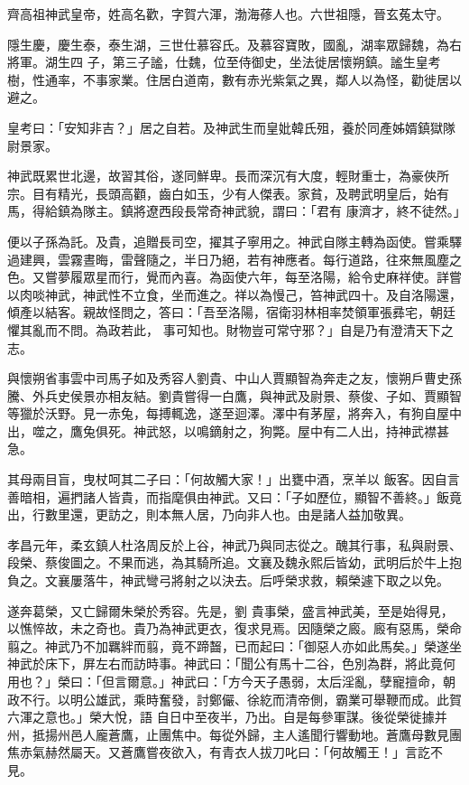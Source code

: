 
\begin{pinyinscope}

 齊高祖神武皇帝，姓高名歡，字賀六渾，渤海蓚人也。六世祖隱，晉玄菟太守。



 隱生慶，慶生泰，泰生湖，三世仕慕容氏。及慕容寶敗，國亂，湖率眾歸魏，為右將軍。湖生四
 子，第三子謐，仕魏，位至侍御史，坐法徙居懷朔鎮。謐生皇考樹，性通率，不事家業。住居白道南，數有赤光紫氣之異，鄰人以為怪，勸徙居以避之。



 皇考曰：「安知非吉？」居之自若。及神武生而皇妣韓氏殂，養於同產姊婿鎮獄隊尉景家。



 神武既累世北邊，故習其俗，遂同鮮卑。長而深沉有大度，輕財重士，為豪俠所宗。目有精光，長頭高顴，齒白如玉，少有人傑表。家貧，及聘武明皇后，始有馬，得給鎮為隊主。鎮將遼西段長常奇神武貌，謂曰：「君有
 康濟才，終不徒然。」



 便以子孫為託。及貴，追贈長司空，擢其子寧用之。神武自隊主轉為函使。嘗乘驛過建興，雲霧晝晦，雷聲隨之，半日乃絕，若有神應者。每行道路，往來無風塵之色。又嘗夢履眾星而行，覺而內喜。為函使六年，每至洛陽，給令史麻祥使。詳嘗以肉啖神武，神武性不立食，坐而進之。祥以為慢己，笞神武四十。及自洛陽還，傾產以結客。親故怪問之，答曰：「吾至洛陽，宿衛羽林相率焚領軍張彞宅，朝廷懼其亂而不問。為政若此，
 事可知也。財物豈可常守邪？」自是乃有澄清天下之志。



 與懷朔省事雲中司馬子如及秀容人劉貴、中山人賈顯智為奔走之友，懷朔戶曹史孫騰、外兵史侯景亦相友結。劉貴嘗得一白鷹，與神武及尉景、蔡俊、子如、賈顯智等獵於沃野。見一赤兔，每搏輒逸，遂至迴澤。澤中有茅屋，將奔入，有狗自屋中出，噬之，鷹兔俱死。神武怒，以鳴鏑射之，狗斃。屋中有二人出，持神武襟甚急。



 其母兩目盲，曳杖呵其二子曰：「何故觸大家！」出甕中酒，烹羊以
 飯客。因自言善暗相，遍捫諸人皆貴，而指麾俱由神武。又曰：「子如歷位，顯智不善終。」飯竟出，行數里還，更訪之，則本無人居，乃向非人也。由是諸人益加敬異。



 孝昌元年，柔玄鎮人杜洛周反於上谷，神武乃與同志從之。醜其行事，私與尉景、段榮、蔡俊圖之。不果而逃，為其騎所追。文襄及魏永熙后皆幼，武明后於牛上抱負之。文襄屢落牛，神武彎弓將射之以決去。后呼榮求救，賴榮遽下取之以免。



 遂奔葛榮，又亡歸爾朱榮於秀容。先是，劉
 貴事榮，盛言神武美，至是始得見，以憔悴故，未之奇也。貴乃為神武更衣，復求見焉。因隨榮之廄。廄有惡馬，榮命翦之。神武乃不加羈絆而翦，竟不蹄齧，已而起曰：「御惡人亦如此馬矣。」榮遂坐神武於床下，屏左右而訪時事。神武曰：「聞公有馬十二谷，色別為群，將此竟何用也？」榮曰：「但言爾意。」神武曰：「方今天子愚弱，太后淫亂，孽寵擅命，朝政不行。以明公雄武，乘時奮發，討鄭儼、徐紇而清帝側，霸業可舉鞭而成。此賀六渾之意也。」榮大悅，語
 自日中至夜半，乃出。自是每參軍謀。後從榮徙據并州，抵揚州邑人龐蒼鷹，止團焦中。每從外歸，主人遙聞行響動地。蒼鷹母數見團焦赤氣赫然屬天。又蒼鷹嘗夜欲入，有青衣人拔刀叱曰：「何故觸王！」言訖不見。




\end{pinyinscope}
